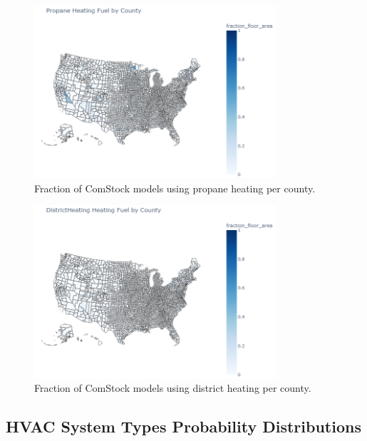 \begin{figure}
  \centering
  \includegraphics[width=0.8\textwidth]{figures/map_propane.png}
  \caption[Fraction of ComStock models using propane heating/water heating per county]{Fraction of ComStock models using propane heating per county.}
  \label{fig:map_propane}
\end{figure}

\begin{figure}
  \centering
  \includegraphics[width=0.8\textwidth]{figures/map_districtheating.png}
  \caption[Fraction of ComStock models using district heating/water heating per county]{Fraction of ComStock models using district heating per county.}
  \label{fig:map_district}
\end{figure}   




\vspace{5mm}
\subsection{HVAC System Types Probability Distributions}
\label{sec:HVAC_System_Type}

